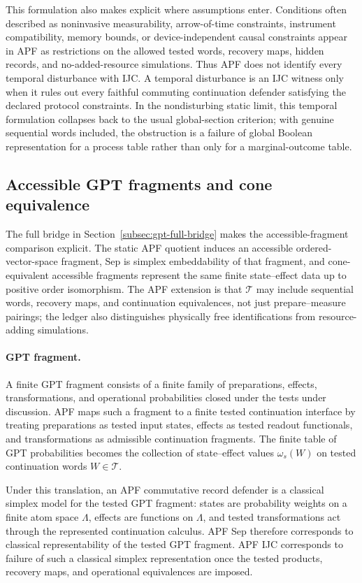 \documentclass[11pt]{article}
\begin{document}
This formulation also makes explicit where assumptions enter.
Conditions often described as noninvasive measurability,
arrow-of-time constraints, instrument compatibility, memory bounds,
or device-independent causal constraints appear in APF as restrictions
on the allowed tested words, recovery maps, hidden records, and
no-added-resource simulations.  Thus APF does not identify every
temporal disturbance with IJC.  A temporal disturbance is an IJC
witness only when it rules out every faithful commuting continuation
defender satisfying the declared protocol constraints.  In the
nondisturbing static limit, this temporal formulation collapses back
to the usual global-section criterion; with genuine sequential words
included, the obstruction is a failure of global Boolean
representation for a process table rather than only for a
marginal-outcome table.

\subsection*{Accessible GPT fragments and cone equivalence}
The full bridge in Section~\ref{subsec:gpt-full-bridge} makes the accessible-fragment comparison explicit.  The static APF quotient induces an accessible ordered-vector-space fragment, Sep is simplex embeddability of that fragment, and cone-equivalent accessible fragments represent the same finite state--effect data up to positive order isomorphism.  The APF extension is that \(\mathcal T\) may include sequential words, recovery maps, and continuation equivalences, not just prepare--measure pairings; the ledger also distinguishes physically free identifications from resource-adding simulations.

\paragraph{GPT fragment.}
A finite GPT fragment consists of a finite family of preparations,
effects, transformations, and operational probabilities closed under
the tests under discussion.  APF maps such a fragment to a finite
tested continuation interface by treating preparations as tested input
states, effects as tested readout functionals, and transformations as
admissible continuation fragments.  The finite table of GPT
probabilities becomes the collection of state--effect values
$\omega_s(W)$ on tested continuation words $W\in\mathcal T$.

Under this translation, an APF commutative record defender is a
classical simplex model for the tested GPT fragment: states are
probability weights on a finite atom space $\Lambda$, effects are
functions on $\Lambda$, and tested transformations act through the
represented continuation calculus.  APF Sep therefore corresponds to
classical representability of the tested GPT fragment.  APF IJC
corresponds to failure of such a classical simplex representation once
the tested products, recovery maps, and operational equivalences are
imposed.
\end{document}
